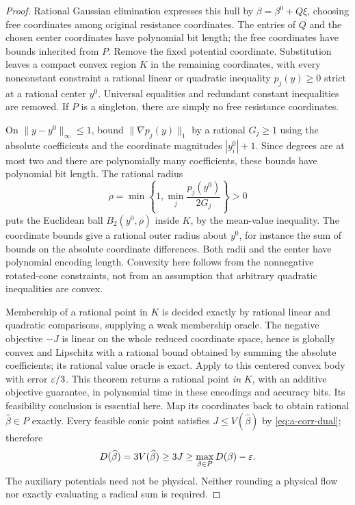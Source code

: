 \begin{proof}
Rational Gaussian elimination expresses this hull by
$\beta=\beta^0+Q\xi$, choosing free coordinates among original resistance
coordinates. The entries of $Q$ and the chosen center coordinates have
polynomial bit length; the free coordinates have bounds inherited from
$P$. Remove the fixed potential coordinate. Substitution leaves a
compact convex region $K$ in the remaining coordinates, with every
nonconstant constraint a rational linear or quadratic inequality
$p_j(y)\ge0$ strict at a rational center $y^0$. Universal equalities
and redundant constant inequalities are removed. If $P$ is a singleton,
there are simply no free resistance coordinates.

On $\|y-y^0\|_\infty\le1$, bound $\|\nabla p_j(y)\|_1$ by a rational
$G_j\ge1$ using the absolute coefficients and the coordinate magnitudes
$|y_i^0|+1$. Since degrees are at most two and there are polynomially
many coefficients, these bounds have polynomial bit length. The rational
radius
\[
 \rho=\min\left\{1,\min_j\frac{p_j(y^0)}{2G_j}\right\}>0
\]
puts the Euclidean ball $B_2(y^0,\rho)$ inside $K$, by the mean-value
inequality. The coordinate bounds give a rational outer radius about
$y^0$, for instance the sum of bounds on the absolute coordinate
differences. Both radii and the center have polynomial encoding length.
Convexity here follows from the nonnegative rotated-cone constraints,
not from an assumption that arbitrary quadratic inequalities are convex.

Membership of a rational point in $K$ is decided exactly by rational
linear and quadratic comparisons, supplying a weak membership oracle.
The negative objective $-J$ is linear on the whole reduced coordinate
space, hence is globally convex and Lipschitz with a rational bound
obtained by summing the absolute coefficients; its rational value oracle
is exact. Apply \citet[Theorem 2.5.9, p.~48]{dadush2012-integer-programming}
to this centered convex body with error $\varepsilon/3$. This theorem returns a
rational point \emph{in} $K$, with an additive objective guarantee, in
polynomial time in these encodings and accuracy bits. Its feasibility
conclusion is essential here. Map its coordinates back to obtain rational
$\widehat\beta\in P$ exactly. Every feasible conic point satisfies
$J\le V(\widehat\beta)$ by \cref{eq:a-corr-dual}; therefore
\[
 D(\widehat\beta)=3V(\widehat\beta)
 \ge3J\ge\max_{\beta\in P}D(\beta)-\varepsilon.
\]
The auxiliary potentials need not be physical. Neither rounding a
physical flow nor exactly evaluating a radical sum is required.
\end{proof}

